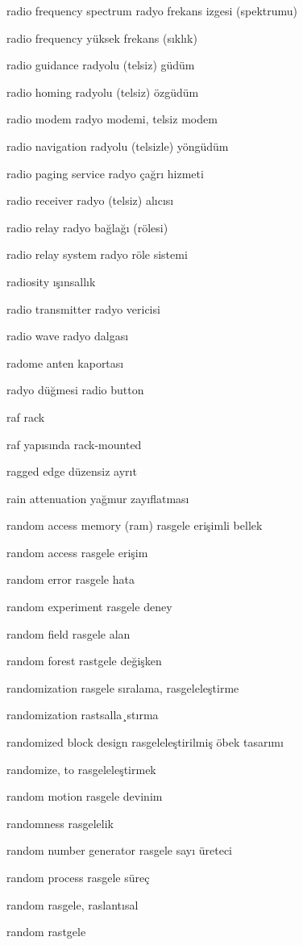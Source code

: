 \documentclass[12pt,fleqn]{article}\usepackage{../../common}
\begin{document}
radio frequency spectrum radyo frekans izgesi (spektrumu)

radio frequency yüksek frekans (sıklık)

radio guidance radyolu (telsiz) güdüm

radio homing radyolu (telsiz) özgüdüm

radio modem radyo modemi, telsiz modem

radio navigation radyolu (telsizle) yöngüdüm

radio paging service radyo çağrı hizmeti

radio receiver radyo (telsiz) alıcısı

radio relay radyo bağlağı (rölesi)

radio relay system radyo röle sistemi

radiosity ışınsallık

radio transmitter radyo vericisi

radio wave radyo dalgası

radome anten kaportası

radyo düğmesi radio button

raf rack

raf yapısında rack-mounted

ragged edge düzensiz ayrıt

rain attenuation yağmur zayıflatması

random access memory (ram) rasgele erişimli bellek

random access rasgele erişim

random error rasgele hata

random experiment rasgele deney

random field rasgele alan

random forest rastgele değişken

randomization rasgele sıralama, rasgeleleştirme

randomization rastsalla¸stırma

randomized block design rasgeleleştirilmiş öbek tasarımı

randomize, to rasgeleleştirmek

random motion rasgele devinim

randomness rasgelelik

random number generator rasgele sayı üreteci

random process rasgele süreç

random rasgele, raslantısal

random rastgele
\end{document}
